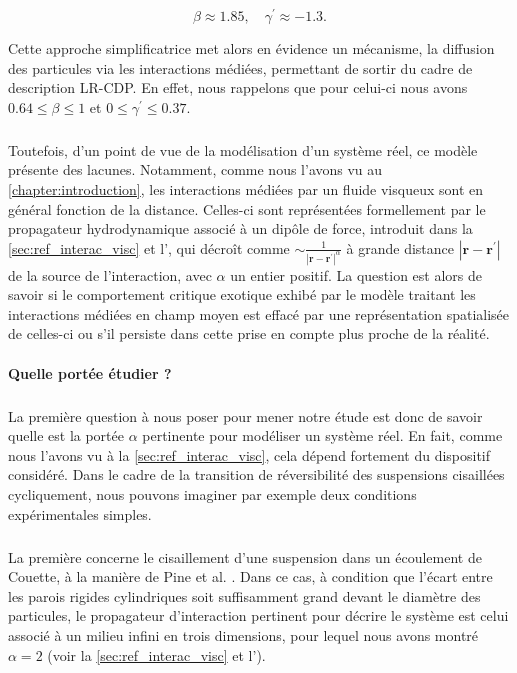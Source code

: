 \begin{equation}
	\beta \approx 1.85, \quad \gamma^\prime \approx -1.3. 
\end{equation}

\noindent Cette approche simplificatrice met alors en évidence un mécanisme, la diffusion des particules via les interactions médiées, permettant de sortir du cadre de description LR-CDP. En effet, nous rappelons que pour celui-ci nous avons $0.64 \leq \beta \leq 1$ et $0 \leq\gamma^\prime \leq 0.37$. 

\subparagraph{}Toutefois, d'un point de vue de la modélisation d'un système réel, ce modèle présente des lacunes. Notamment, comme nous l'avons vu au \autoref{chapter:introduction}, les interactions médiées par un fluide visqueux sont en général fonction de la distance. Celles-ci sont représentées formellement par le propagateur hydrodynamique associé à un dipôle de force, introduit dans la \autoref{sec:ref_interac_visc} et l', qui décroît comme $\sim \frac{1}{|\mathbf{r} - \mathbf{r}^\prime|^\alpha}$ à grande distance $|\mathbf{r} - \mathbf{r}^\prime|$ de la source de l'interaction, avec $\alpha$ un entier positif. La question est alors de savoir si le comportement critique exotique exhibé par le modèle traitant les interactions médiées en champ moyen est effacé par une représentation spatialisée de celles-ci ou s'il persiste dans cette prise en compte plus proche de la réalité.

\paragraph{Quelle portée étudier ?}

\subparagraph{}La première question à nous poser pour mener notre étude est donc de savoir quelle est la portée $\alpha$ pertinente pour modéliser un système réel. En fait, comme nous l'avons vu à la \autoref{sec:ref_interac_visc}, cela dépend fortement du dispositif considéré. Dans le cadre de la transition de réversibilité des suspensions cisaillées cycliquement, nous pouvons imaginer par exemple deux conditions expérimentales simples.

\subparagraph{}La première concerne le cisaillement d'une suspension dans un écoulement de Couette, à la manière de Pine et al. \cite{pine_chaos_2005}. Dans ce cas, à condition que l'écart entre les parois rigides cylindriques soit suffisamment grand devant le diamètre des particules, le propagateur d'interaction pertinent pour décrire le système est celui associé à un milieu infini en trois dimensions, pour lequel nous avons montré $\alpha = 2$ (voir la \autoref{sec:ref_interac_visc} et l').


